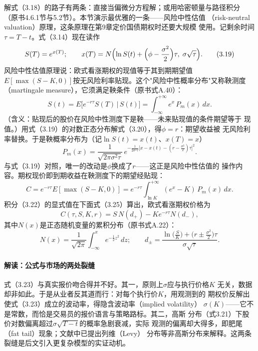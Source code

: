 解式（3.18）的路子有两条：直接当偏微分方程解；或用哈密顿量与路径积分
（原书4.6.1节与5.2节）。本节演示最优雅的一条——风险中性估值
（risk-neutral valuation）原理，这条原理在第9章定价国债期权时还要大规模
使用。记剩余时间$\tau=T-t$。式（3.14）现在读作
\begin{equation*}
S(T)=e^{x(T)};\qquad
x(T)=N\Bigl(\ln S(t)+\Bigl(\phi-\frac{\sigma^{2}}{2}\Bigr)\tau,\;
\sigma\sqrt{\tau}\Bigr).
\tag{3.19}
\end{equation*}
风险中性估值原理说：欧式看涨期权的现值等于其到期期望值
$E[\max(S-K,0)]$按无风险利率贴现。这个"风险中性概率分布"又称鞅测度
（martingale measure），它须满足鞅条件（原书式A.40）：
\begin{equation*}
S(t)=E\bigl[e^{-r\tau}S(T)\,\big|\,S(t)\bigr]
=\int_{-\infty}^{+\infty}e^{x}\,P_m(x)\,dx.
\tag{3.20}
\end{equation*}
（含义：贴现后的股价在风险中性测度下是鞅——未来贴现值的条件期望等于
现值。）用式（3.19）的对数正态分布解式（3.20），得$\phi=r$：期望收益被
无风险利率替换。于是鞅概率分布为（记$\ln S(t)=x(t)$、$x(T)=x$）
\begin{equation*}
P_m(x)=\frac{1}{\sqrt{2\pi\sigma^{2}\tau}}\,
e^{-\frac{1}{2\sigma^{2}\tau}\bigl[x-x(t)-(r-\frac{\sigma^{2}}{2})\tau\bigr]^{2}}.
\tag{3.21}
\end{equation*}
与式（3.19）对照，唯一的改动是$\phi$换成了$r$——这正是风险中性估值的
操作内容。期权现价即到期收益在鞅测度下的期望经贴现：
\begin{equation*}
C=e^{-r\tau}E[\max(S-K,0)]
=e^{-r\tau}\int_{\ln K}^{+\infty}(e^{x}-K)\,P_m(x)\,dx.
\tag{3.22}
\end{equation*}
积分（3.22）的显式值在下面式（3.25）算出，欧式看涨期权价格为
\begin{equation*}
C(\tau,S,K,r)=S\,N(d_{+})-Ke^{-r\tau}N(d_{-}),
\tag{3.23}
\end{equation*}
其中$N(x)$是正态随机变量的累积分布（原书式A.22）：
\begin{equation*}
N(x)=\frac{1}{\sqrt{2\pi}}\int_{-\infty}^{x}e^{-\frac{1}{2}z^{2}}\,dz;
\qquad
d_{\pm}=\frac{\ln\bigl(\frac{S}{K}\bigr)+\bigl(r\pm\frac{\sigma^{2}}{2}\bigr)\tau}
{\sigma\sqrt{\tau}}.
\tag{3.24}
\end{equation*}

\paragraph{解读：公式与市场的两处裂缝}
式（3.23）与真实报价吻合得并不好。其一，原则上$\sigma$应与执行价格$K$
无关，数据却非如此。于是从业者反其道而行：对每个执行价$K$，用观测到的
期权价反解出使式（3.23）成立的波动率，得隐含波动率（implied volatility）
$\sigma(K)$——它不是常数，而恰是交易员的报价语言与策略路标。其二，高斯
分布（式3.21）下股价对数偏离超过$\sigma\sqrt{T-t}$的概率急剧衰减，实际
观测的偏离却大得多，即肥尾（fat tail）现象；文献中已提出列维（Levy）
分布等非高斯分布来解释。这两条裂缝是后文引入更复杂模型的实证动机。

